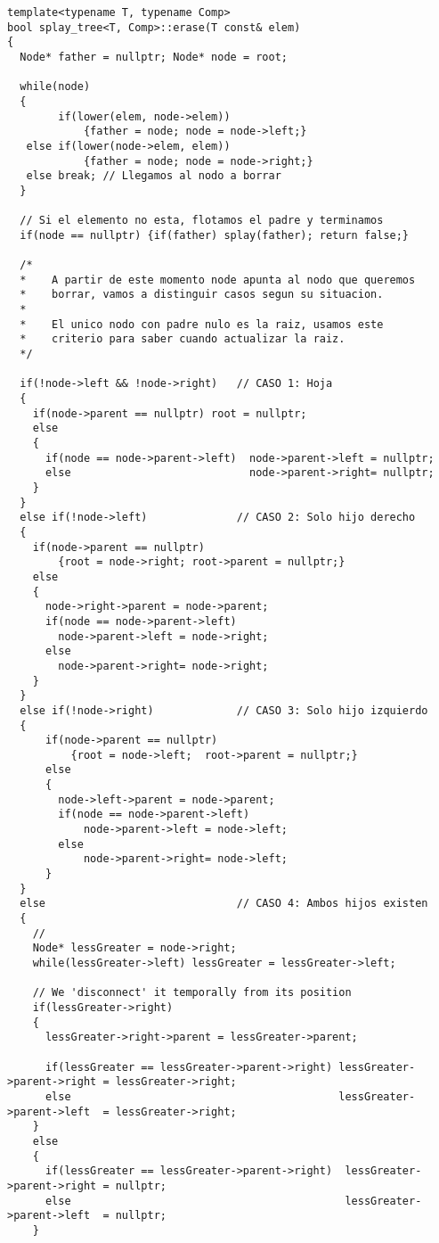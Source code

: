 \documentclass[letterpaper,12pt]{article}
\begin{document}
\begin{lstlisting}
template<typename T, typename Comp>
bool splay_tree<T, Comp>::erase(T const& elem)
{
  Node* father = nullptr; Node* node = root;

  while(node)
  {
        if(lower(elem, node->elem)) 
            {father = node; node = node->left;}
   else if(lower(node->elem, elem)) 
            {father = node; node = node->right;}
   else break; // Llegamos al nodo a borrar
  }

  // Si el elemento no esta, flotamos el padre y terminamos
  if(node == nullptr) {if(father) splay(father); return false;}

  /*
  *    A partir de este momento node apunta al nodo que queremos
  *    borrar, vamos a distinguir casos segun su situacion.
  *
  *    El unico nodo con padre nulo es la raiz, usamos este 
  *    criterio para saber cuando actualizar la raiz.
  */
  
  if(!node->left && !node->right)   // CASO 1: Hoja
  {
    if(node->parent == nullptr) root = nullptr;
    else
    {
      if(node == node->parent->left)  node->parent->left = nullptr;
      else                            node->parent->right= nullptr;
    }
  }
  else if(!node->left)              // CASO 2: Solo hijo derecho
  {
    if(node->parent == nullptr) 
        {root = node->right; root->parent = nullptr;}
    else
    {
      node->right->parent = node->parent;
      if(node == node->parent->left)  
        node->parent->left = node->right;
      else                            
        node->parent->right= node->right;
    }
  }
  else if(!node->right)             // CASO 3: Solo hijo izquierdo
  {
      if(node->parent == nullptr) 
          {root = node->left;  root->parent = nullptr;}
      else
      {
        node->left->parent = node->parent;
        if(node == node->parent->left)  
            node->parent->left = node->left;
        else                            
            node->parent->right= node->left;
      }
  }
  else                              // CASO 4: Ambos hijos existen
  {
    // 
    Node* lessGreater = node->right; 
    while(lessGreater->left) lessGreater = lessGreater->left;

    // We 'disconnect' it temporally from its position
    if(lessGreater->right)
    {
      lessGreater->right->parent = lessGreater->parent;

      if(lessGreater == lessGreater->parent->right) lessGreater->parent->right = lessGreater->right;
      else                                          lessGreater->parent->left  = lessGreater->right;
    }
    else
    {
      if(lessGreater == lessGreater->parent->right)  lessGreater->parent->right = nullptr;
      else                                           lessGreater->parent->left  = nullptr;
    }


\end{lstlisting}
\end{document}
